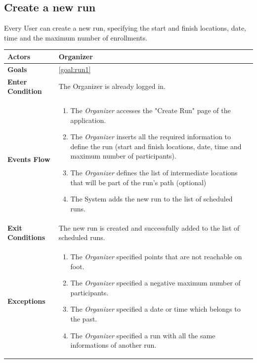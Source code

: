   \newpage
  \subsection{Create a new run}
Every User can create a new run, specifying the start and finish locations, date, time and the maximum number of enrollments.

\begin{table}[H]
	\centering
    
    \begin{tabular}{|p{3.5cm}|p{10.3cm}|}
    
    \hline
    \textbf{\large{Actors}} & Organizer \\			
    \hline		 					
    \textbf{\large{Goals}} 				& \ref{goal:run1}\\
    
    \hline
    \textbf{\large{Enter Condition}}	& The Organizer is already logged in.		\\
    
    \hline
    \textbf{\large{Events Flow}}		& \begin{enumerate}[leftmargin=0.5cm]
                                          	\item The \emph{Organizer} accesses the "Create Run" page of the application.
                                            \item The \emph{Organizer} inserts all the required information to define the run (start and finish locations, date, time and maximum number of participants).
                                             \item The \emph{Organizer} defines the list of intermediate locations that will be part of the run's path (optional)
                                            \item The System adds the new run to the list of scheduled runs.
                                           
                                          \end{enumerate}
    										\\
    \hline
    \textbf{\large{Exit Conditions}}    & The new run is created and successfully added to the list of scheduled runs.  \\
    
    \hline
    \textbf{\large{Exceptions}} 		& \begin{enumerate}[leftmargin=0.5cm]
    	\item The \emph{Organizer} specified points that are not reachable on foot.
	\item The \emph{Organizer} specified a negative maximum number of participants.
	\item The \emph{Organizer} specified a date or time which belongs to the past.                                        	\item The \emph{Organizer} specified a run with all the same informations of another run.
	\end{enumerate}
	

\end{tabular}
\end{table}
